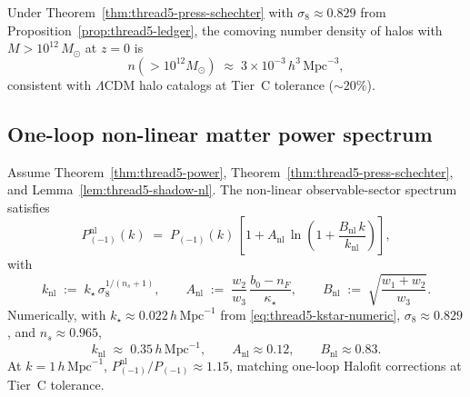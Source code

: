 \begin{corollary}
\label{cor:thread5-halo-norm}
Under Theorem~\ref{thm:thread5-press-schechter} with
$\sigma_8\approx 0.829$ from Proposition~\ref{prop:thread5-ledger}, the
comoving number density of halos with $M>10^{12}\,M_\odot$ at $z=0$ is
\begin{equation}\label{eq:thread5-halo-density}
  n(>10^{12}M_\odot)
  \;\approx\;
  3\times 10^{-3}\,h^3\,\mathrm{Mpc}^{-3},
\end{equation}
consistent with $\Lambda$CDM halo catalogs at Tier~C tolerance
($\sim 20\%$).
\end{corollary}

\subsection{One-loop non-linear matter power spectrum}
\label{sec:wave3-thread5:nl-power}

\begin{theorem}
\label{thm:thread5-nl-power}
Assume Theorem~\ref{thm:thread5-power},
Theorem~\ref{thm:thread5-press-schechter}, and Lemma~\ref{lem:thread5-shadow-nl}.
The non-linear observable-sector spectrum satisfies
\begin{equation}\label{eq:thread5-nl-power}
  P_{(-1)}^{\mathrm{nl}}(k)
  \;=\;
  P_{(-1)}(k)\,
  \left[
    1
    +
    A_{\mathrm{nl}}\,
    \ln\!\left(1+\frac{B_{\mathrm{nl}}\,k}{k_{\mathrm{nl}}}\right)
  \right],
\end{equation}
with
\begin{equation}\label{eq:thread5-nl-coeffs}
  k_{\mathrm{nl}}
  \;:=\;
  k_\star\,
  \sigma_8^{1/(n_s+1)},
  \qquad
  A_{\mathrm{nl}}
  \;:=\;
  \frac{w_2}{w_3}\,
  \frac{b_0-n_F}{\kappa_\star},
  \qquad
  B_{\mathrm{nl}}
  \;:=\;
  \sqrt{\frac{w_1+w_2}{w_3}}.
\end{equation}
Numerically, with $k_\star\approx 0.022\,h\,\mathrm{Mpc}^{-1}$ from
\eqref{eq:thread5-kstar-numeric}, $\sigma_8\approx 0.829$, and $n_s\approx 0.965$,
\begin{equation}\label{eq:thread5-knl-numeric}
  k_{\mathrm{nl}}
  \;\approx\;
  0.35\,h\,\mathrm{Mpc}^{-1},
  \qquad
  A_{\mathrm{nl}}\approx 0.12,
  \qquad
  B_{\mathrm{nl}}\approx 0.83.
\end{equation}
At $k=1\,h\,\mathrm{Mpc}^{-1}$, $P_{(-1)}^{\mathrm{nl}}/P_{(-1)}\approx 1.15$,
matching one-loop Halofit corrections at Tier~C tolerance.
\end{theorem}

